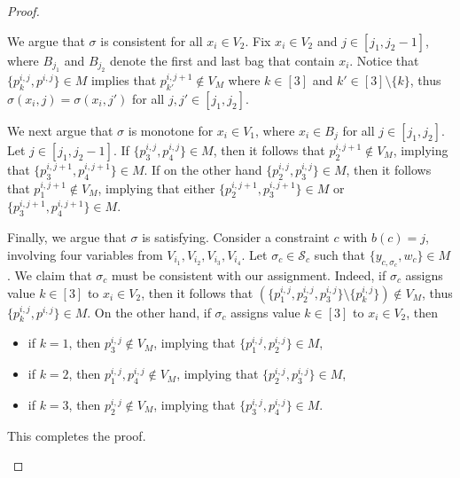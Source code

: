\begin{proof}
\begin{claimproof}
        We argue that $\sigma$ is consistent for all $x_i \in V_2$.
        Fix $x_i \in V_2$ and $j \in [j_1,j_2-1]$, where $B_{j_1}$ and $B_{j_2}$ denote the first and last
        bag that contain $x_i$.
        Notice that $\{p^{i,j}_k, p^{i,j}\} \in M$ implies that $p^{i,j+1}_{k'} \notin V_M$
        where $k \in [3]$ and $k' \in [3] \setminus \{k\}$, thus $\sigma(x_i,j) = \sigma(x_i,j')$
        for all $j,j' \in [j_1,j_2]$.

        We next argue that $\sigma$ is monotone for $x_i \in V_1$,
        where $x_i \in B_j$ for all $j \in [j_1,j_2]$.
        Let $j \in [j_1,j_2-1]$.
        If $\{p^{i,j}_3, p^{i,j}_4\} \in M$,
        then it follows that $p^{i,j+1}_2 \notin V_M$,
        implying that $\{p^{i,j+1}_3, p^{i,j+1}_4\} \in M$.
        If on the other hand $\{p^{i,j}_2, p^{i,j}_3\} \in M$,
        then it follows that $p^{i,j+1}_1 \notin V_M$,
        implying that either $\{p^{i,j+1}_2, p^{i,j+1}_3\} \in M$ or $\{p^{i,j+1}_3, p^{i,j+1}_4\} \in M$.

        Finally, we argue that $\sigma$ is satisfying.
        Consider a constraint $c$ with $b(c)=j$,
        involving four variables from $V_{i_1}, V_{i_2}, V_{i_3}, V_{i_4}$.
        Let $\sigma_c \in \mathcal{S}_c$ such that $\{y_{c,\sigma_c},w_c\} \in M$.
        We claim that $\sigma_c$ must be consistent with our assignment.
        Indeed, if $\sigma_c$ assigns value $k \in [3]$ to $x_i \in V_2$,
        then it follows that $(\{p^{i,j}_1,p^{i,j}_2,p^{i,j}_3\} \setminus \{p^{i,j}_k\}) \notin V_M$,
        thus $\{p^{i,j}_k, p^{i,j}\} \in M$.
        On the other hand, if $\sigma_c$ assigns value $k \in [3]$ to $x_i \in V_2$,
        then
        \begin{itemize}
            \item if $k=1$, then $p^{i,j}_3 \notin V_M$, implying that $\{p^{i,j}_1,p^{i,j}_2\} \in M$,
            \item if $k=2$, then $p^{i,j}_1,p^{i,j}_4 \notin V_M$, implying that $\{p^{i,j}_2,p^{i,j}_3\} \in M$,
            \item if $k=3$, then $p^{i,j}_2 \notin V_M$, implying that $\{p^{i,j}_3,p^{i,j}_4\} \in M$.
        \end{itemize}
        This completes the proof.
    \end{claimproof}


\end{proof}

